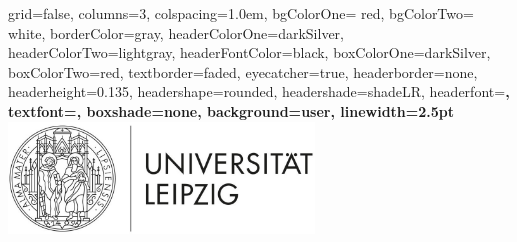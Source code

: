 \documentclass[portrate,paperwidth=841mm,paperheight=1189mm,fontscale=0.4,margin=1cm]{baposter}
\begin{document}
\begin{poster}%
  {
  grid=false, %
  columns=3,
  colspacing=1.0em,
  bgColorOne= red, %
  bgColorTwo= white, %
  borderColor=gray, %
  headerColorOne=darkSilver, %
  headerColorTwo=lightgray, 
  headerFontColor=black, %
  boxColorOne=darkSilver, %
  boxColorTwo=red, %
  textborder=faded,
  eyecatcher=true,
  headerborder=none, %
  headerheight=0.135\textheight,
  headershape=rounded, %
  headershade=shadeLR,
  headerfont=\LARGE\bf,  %
  textfont={\color{black}\setlength{\parindent}{1.5em}},
  boxshade=none, %
  background=user, %
  linewidth=2.5pt
  }
  {
      \includegraphics[height=8.0em]{uni_leipzig-logo.jpg}\\
      
}
\end{poster}
\end{document}
